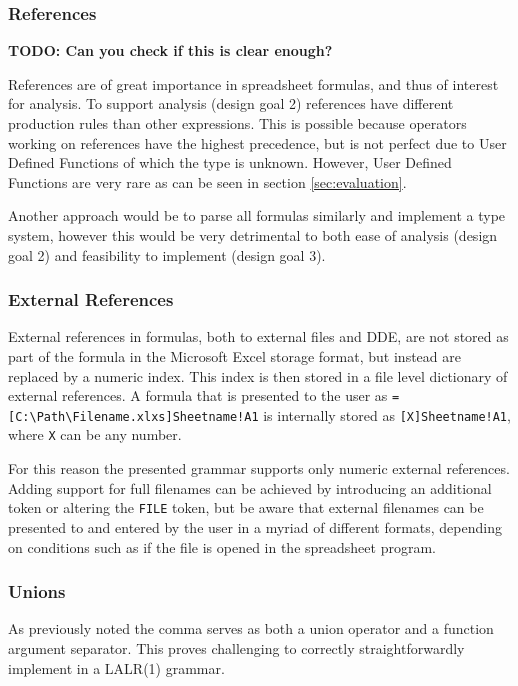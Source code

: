 \documentclass[conference]{IEEEtran}
\newcommand{\todo}[1]{\textbf{TODO: #1}}
\begin{document}
\subsubsection{References}
\label{tradeoff:references}

\todo{Can you check if this is clear enough?}

References are of great importance in spreadsheet formulas, and thus of interest for analysis.
To support analysis (design goal 2) references have different production rules than other expressions.
This is possible because operators working on references have the highest precedence, but is not perfect due to User Defined Functions of which the type is unknown.
However, User Defined Functions are very rare as can be seen in section \ref{sec:evaluation}.

Another approach would be to parse all formulas similarly and implement a type system, however this would be very detrimental to both ease of analysis (design goal 2) and feasibility to implement (design goal 3).

\subsubsection{External References}

External references in formulas, both to external files and DDE, are not stored as part of the formula in the Microsoft Excel storage format, but instead are replaced by a numeric index.
This index is then stored in a file level dictionary of external references.
A formula that is presented to the user as \texttt{=[C:\textbackslash Path\textbackslash Filename.xlxs]Sheetname!A1} is internally stored as \texttt{[X]Sheetname!A1}, where \texttt{X} can be any number.

For this reason the presented grammar supports only numeric external references.
Adding support for full filenames can be achieved by introducing an additional token or altering the \texttt{FILE} token, but be aware that external filenames can be presented to and entered by the user in a myriad of different formats, depending on conditions such as if the file is opened in the spreadsheet program.

\subsubsection{Unions}
\label{subsec:desing:unions}

As previously noted the comma serves as both a union operator and a function argument separator.
This proves challenging to correctly straightforwardly implement in a LALR(1) grammar.
\end{document}
